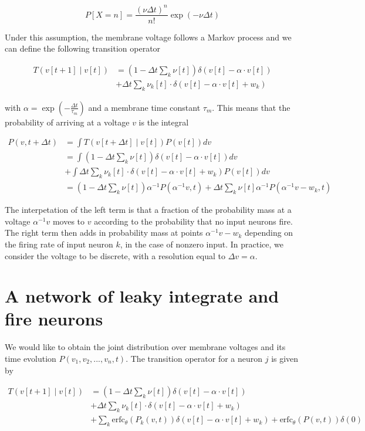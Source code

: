 \documentclass{ucetd}
\begin{document}
\begin{equation*}
P[X=n] = \frac{(\nu\Delta t)^{n}}{n!}\exp\left(-\nu\Delta t\right)
\end{equation*}

Under this assumption, the membrane voltage follows a Markov process and we can define the following transition operator

\begin{align*}
T(v[t+1]\;|\;v[t]) &= \left(1-\Delta t\sum_{k}\nu[t]\right)\delta\left(v[t]-\alpha\cdot v[t]\right)\\
&+ \Delta t\sum_{k}\nu_{k}[t]\cdot\delta\left(v[t]-\alpha \cdot v[t] + w_{k}\right)
\end{align*}

with $\alpha = \exp\left(-\frac{\Delta t}{\tau_{m}}\right)$ and a membrane time constant $\tau_{m}$. This means that the probability of arriving at a voltage $v$ is the integral

\begin{align*}
P(v,t+\Delta t) &= \int T(v[t+\Delta t]\;|\;v[t])P(v[t])dv\\
&= \int \left(1-\Delta t\sum_{k}\nu[t]\right)\delta\left(v[t]-\alpha\cdot v[t]\right)dv\\
&+ \int \Delta t\sum_{k}\nu_{k}[t]\cdot\delta\left(v[t]-\alpha \cdot v[t] + w_{k}\right)P(v[t])dv\\
&= \left(1-\Delta t\sum_{k}\nu[t]\right)\alpha^{-1}P(\alpha^{-1}v,t) + \Delta t \sum_{k}\nu[t] \alpha^{-1}P(\alpha^{-1}v-w_{k},t)
\end{align*}

The interpetation of the left term is that a fraction of the probability mass at a voltage $\alpha^{-1}v$ moves to $v$ according to the probability that no input neurons fire. The right term then adds in probability mass at points $\alpha^{-1}v -w_{k}$ depending on the firing rate of input neuron $k$, in the case of nonzero input. In practice, we consider the voltage to be discrete, with a resolution equal to $\Delta v  = \alpha$.

\section{A network of leaky integrate and fire neurons}

We would like to obtain the joint distribution over membrane voltages and its time evolution $P(v_{1}, v_{2}, ... , v_{n}, t)$. The transition operator for a neuron $j$ is given by 


\begin{align*}
T(v[t+1]\;|\;v[t]) &= \left(1-\Delta t\sum_{k}\nu[t]\right)\delta\left(v[t]-\alpha\cdot v[t]\right)\\
&+ \Delta t\sum_{k}\nu_{k}[t]\cdot\delta\left(v[t]-\alpha \cdot v[t] + w_{k}\right)\\
&+ \sum_{k} \mathrm{erfc}_{\theta}\left(P_{k}(v, t)\right)\delta\left(v[t]-\alpha \cdot v[t] + w_{k}\right) + \mathrm{erfc}_{\theta}\left(P(v,t)\right)\delta\left(0\right)
\end{align*}
\end{document}
